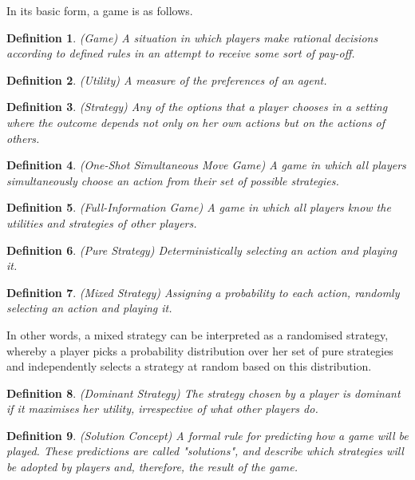\documentclass{article}
\newtheorem{definition}{Definition}
\begin{document}
In its basic form, a game is as follows.

\begin{definition}
(Game) A situation in which players make rational decisions according to defined rules in an attempt to receive some sort of pay-off.
\end{definition}

\begin{definition}
(Utility) A measure of the preferences of an agent.
\end{definition}

\begin{definition}
(Strategy) Any of the options that a player chooses in a setting where the outcome depends not only on her own actions but on the actions of others.
\end{definition}

\begin{definition}
(One-Shot Simultaneous Move Game) A game in which all players simultaneously choose an action from their set of possible strategies.
\end{definition}

\begin{definition}
(Full-Information Game) A game in which all players know the utilities and strategies of other players.
\end{definition}

\begin{definition}
(Pure Strategy) Deterministically selecting an action and playing it.
\end{definition}

\begin{definition}
(Mixed Strategy) Assigning a probability to each action, randomly selecting an action and playing it.
\end{definition}

In other words, a mixed strategy can be interpreted as a randomised strategy, whereby a player picks a probability distribution over her set of pure strategies and independently selects a strategy at random based on this distribution.

\begin{definition}
(Dominant Strategy) The strategy chosen by a player is dominant if it maximises her utility, irrespective of what other players do.
\end{definition}

\begin{definition}
(Solution Concept) A formal rule for predicting how a game will be played. These predictions are called "solutions", and describe which strategies will be adopted by players and, therefore, the result of the game.
\end{definition}
\end{document}
